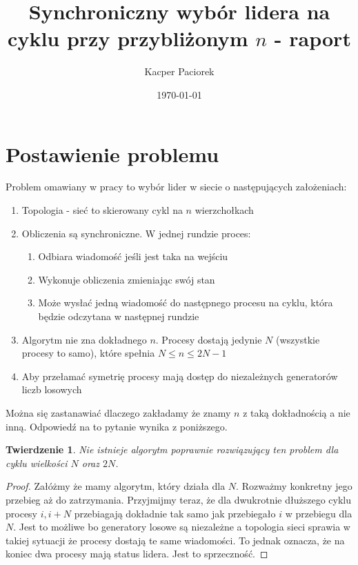 \documentclass[11pt,a4paper]{article}
\title{Synchroniczny wybór lidera na cyklu przy przybliżonym $n$ - raport}
\author{Kacper Paciorek}
\date{\today}
\newtheorem{theorem}{Twierdzenie}
\begin{document}
\maketitle

\section{Postawienie problemu}
Problem omawiany w pracy to wybór lider w siecie o następujących założeniach:
\begin{enumerate}
    \item Topologia - sieć to skierowany cykl na $n$ wierzchołkach
    \item Obliczenia są synchroniczne. W jednej rundzie proces:
        \begin{enumerate}
            \item Odbiara wiadomość jeśli jest taka na wejściu
            \item Wykonuje obliczenia zmieniając swój stan
            \item Może wysłać jedną wiadomość do następnego procesu na cyklu, która będzie odczytana w następnej rundzie
        \end{enumerate}
    \item Algorytm nie zna dokładnego $n$. Procesy dostają jedynie $N$ (wszystkie procesy to samo), które spełnia $N \leq n \leq 2N-1$
    \item Aby przełamać symetrię procesy mają dostęp do niezależnych generatorów liczb losowych
\end{enumerate}

Można się zastanawiać dlaczego zakładamy że znamy $n$ z taką dokładnością a nie inną. Odpowiedź na to pytanie wynika z poniższego.

\begin{theorem}
    Nie istnieje algorytm poprawnie rozwiązujący ten problem dla cyklu wielkości $N$ oraz $2N$.
\end{theorem}
\begin{proof}
    Załóżmy że mamy algorytm, który działa dla $N$. Rozważmy konkretny jego przebieg aż do zatrzymania. Przyjmijmy teraz, że 
    dla dwukrotnie dłuższego cyklu procesy $i, i+N$ przebiagają dokładnie tak samo jak przebiegało $i$ w przebiegu dla $N$. Jest to możliwe bo 
    generatory losowe są niezależne a topologia sieci sprawia w takiej sytuacji że procesy dostają te same wiadomości. To jednak oznacza, że na koniec 
    dwa procesy mają status lidera. Jest to sprzeczność.
\end{proof}
\end{document}
